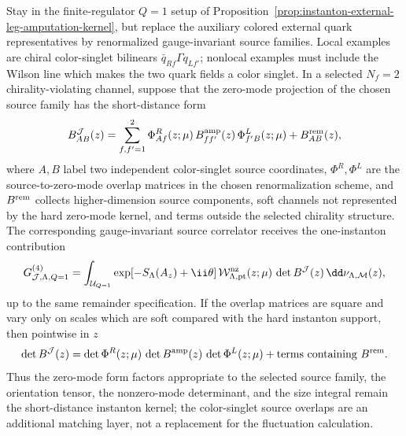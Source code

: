 \begin{controlledapproximation}
\label{ca:instanton-color-singlet-hadronic-matching}
Stay in the finite-regulator \(Q=1\) setup of
Proposition~\ref{prop:instanton-external-leg-amputation-kernel}, but replace
the auxiliary colored external quark representatives by renormalized
gauge-invariant source families.  Local examples are chiral color-singlet
bilinears \(\bar q_{R f}\Gamma q_{L f'}\); nonlocal examples must include the
Wilson line which makes the two quark fields a color singlet.  In a selected
\(N_f=2\) chirality-violating channel, suppose that the zero-mode projection
of the chosen source family has the short-distance form
\begin{equation}
  B^{\mathcal J}_{AB}(z)
  =
  \sum_{f,f'=1}^{2}
  \Phi^{R}_{A f}(z;\mu)\,
  B^{\rm amp}_{ff'}(z)\,
  \Phi^{L}_{f' B}(z;\mu)
  +
  B^{\rm rem}_{AB}(z),
  \label{eq:instanton-color-singlet-source-projection}
\end{equation}
where \(A,B\) label two independent color-singlet source coordinates,
\(\Phi^R,\Phi^L\) are the source-to-zero-mode overlap matrices in the chosen
renormalization scheme, and \(B^{\rm rem}\) collects higher-dimension source
components, soft channels not represented by the hard zero-mode kernel, and
terms outside the selected chirality structure.  The corresponding
gauge-invariant source correlator receives the one-instanton contribution
\begin{equation}
  G^{(4)}_{\mathcal J,\Lambda,Q=1}
  =
  \int_{\mathcal U_{Q=1}}
  \exp[-S_\Lambda(A_z)+\ii\theta]\,
  \mathcal W_{\Lambda,{\rm pt}}^{\rm nz}(z;\mu)\,
  \det B^{\mathcal J}(z)\,
  \dd\nu_{\Lambda,\mathcal M}(z),
  \label{eq:instanton-color-singlet-source-correlator}
\end{equation}
up to the same remainder specification.  If the overlap matrices are square
and vary only on scales which are soft compared with the hard instanton
support, then pointwise in \(z\)
\begin{equation}
  \det B^{\mathcal J}(z)
  =
  \det\Phi^R(z;\mu)\,
  \det B^{\rm amp}(z)\,
  \det\Phi^L(z;\mu)
  +
  \hbox{terms containing }B^{\rm rem}.
  \label{eq:instanton-color-singlet-determinant-projection}
\end{equation}
Thus the zero-mode form factors appropriate to the selected source family, the
orientation tensor, the nonzero-mode determinant, and the size integral remain
the short-distance instanton kernel; the color-singlet source overlaps are an
additional matching layer, not a replacement for the fluctuation calculation.


\end{controlledapproximation}
